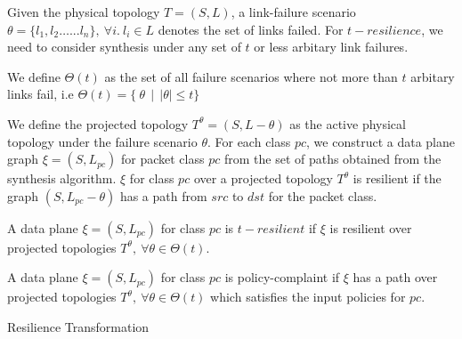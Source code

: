 Given the physical topology $T=(S,L)$, a link-failure
scenario $\theta = \{l_1, l_2 \ldots ... l_n\},\ \forall i.\ l_i \in L$ 
denotes the set of links failed. For $t-resilience$, we need to
consider synthesis under any set of $t$ or less arbitary link failures.
\begin{mydef}
	We define $\Theta(t)$ as the set of all failure scenarios where not more than $t$
	arbitary links fail, i.e $\Theta(t) = \{ \ \theta \ \ | \ \ |\theta| \leq t\}$
\end{mydef}
We define the projected topology $T^{\theta} = (S, L - \theta)$ as the active 
physical topology under the failure scenario $\theta$. 	For each class $pc$,
we construct a data plane graph $\xi = (S, L_{pc})$ for packet class $pc$ from the set
of paths obtained from the synthesis algorithm. $\xi$
for class $pc$ over a projected topology $T^\theta$ 
is resilient if the graph $(S, L_{pc} - \theta)$ has a path from $src$ to $dst$ 
for the packet class. 
\begin{mydef}[Resilience]
	A data plane $\xi = (S, L_{pc})$ for class $pc$ is $t-resilient$ if $\xi$ is 
	resilient over projected topologies $T^\theta,\ \forall \theta \in \Theta(t)$.
\end{mydef}
\begin{mydef}
	A data plane $\xi = (S, L_{pc})$ for class $pc$ is policy-complaint if $\xi$ has 
	a path over projected topologies $T^\theta,\ \forall \theta \in \Theta(t)$ which
	satisfies the input policies for $pc$. 
\end{mydef}
\begin{algorithm}[h]
	\begin{footnotesize}
		\caption{Resilience Transformation}
		\label{restransform}
		\begin{algorithmic}[1]
			\vspace*{0.25cm}
			 \label{lst:line:respc}
			 \label{lst:line:respcend}
			\EndFor
			 \label{lst:line:respolicy}
			\EndFor \\
		\end{algorithmic}
	\end{footnotesize}
\end{algorithm}
